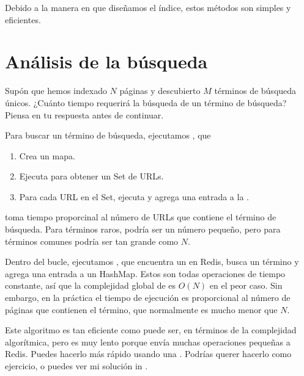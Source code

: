 \documentclass[12pt]{book}
\theoremstyle{exercise}
\begin{document}
Debido a la manera en que diseñamos el índice, estos métodos son simples y
eficientes.


\section{Análisis de la búsqueda}
\label{analysis-of-lookup}

Supón que hemos indexado $N$ páginas y descubierto $M$
términos de búsqueda únicos. ¿Cuánto tiempo requerirá la búsqueda de un término
de búsqueda? Piensa en tu respuesta antes de continuar.


Para buscar un término de búsqueda, ejecutamos , que

\begin{enumerate}

\item
  Crea un mapa.

\item
  Ejecuta  para obtener un Set de URLs.

\item
  Para cada URL en el Set, ejecuta  y agrega una entrada
  a la .

\end{enumerate}

 toma tiempo proporcinal al número de URLs que contiene
el término de búsqueda. Para términos raros, podría ser un número pequeño,
pero para términos comunes podría ser tan grande como $N$.

Dentro del bucle, ejecutamos , que encuentra un
 en Redis, busca un término y agrega una entrada a un
HashMap. Estos son todas operaciones de tiempo constante, así que la complejidad
global de  es $O(N)$ en el peor caso. Sin embargo, en la práctica
el tiempo de ejecución es proporcional al número de páginas que contienen
el término, que normalmente es mucho menor que $N$.


Este algoritmo es tan eficiente como puede ser, en términos de la
complejidad algorítmica, pero es muy lento porque envía muchas operaciones
pequeñas a Redis. Puedes hacerlo más rápido usando una
. Podrías querer hacerlo como ejercicio, o puedes
ver mi solución in .

\end{document}
